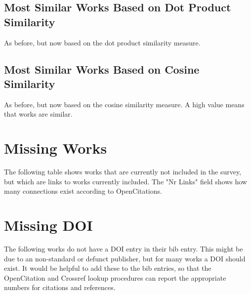 \documentclass[a4paper]{article}
\begin{document}
\clearpage
\subsection{Most Similar Works Based on Dot Product Similarity}

As before, but now based on the dot product similarity measure.





\clearpage
\subsection{Most Similar Works Based on Cosine Similarity}
As before, but now based on the cosine similarity measure. A high value means that works are similar.





\clearpage
\section{Missing Works}

The following table shows works that are currently not included in the survey, but which are links to works currently included. The "Nr Links" field shows how many connections exist according to OpenCitations.



\clearpage
\section{Missing DOI}

The following works do not have a DOI entry in their bib entry. This might be due to an non-standard or defunct publisher, but for many works a DOI should exist. It would be helpful to add these to the bib entries, so that the OpenCitation and Crossref lookup procedures can report the appropriate numbers for citations and references.



\printindex
\end{document}
